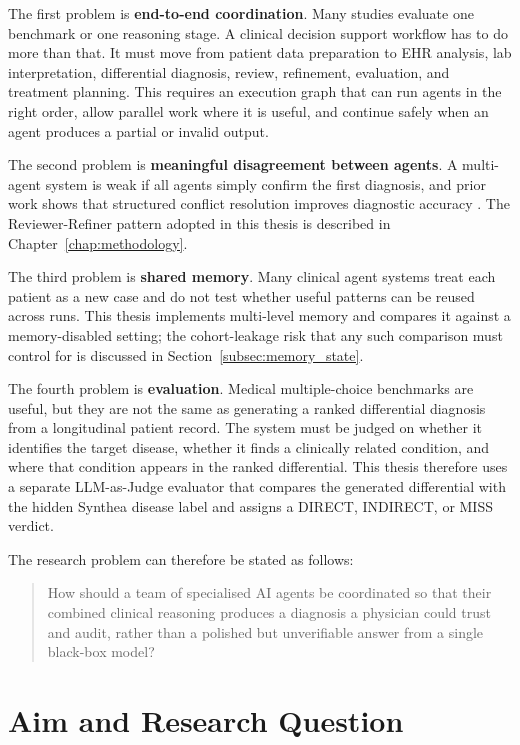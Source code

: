 The first problem is \textbf{end-to-end coordination}. Many studies evaluate
one benchmark or one reasoning stage. A clinical decision support workflow has
to do more than that. It must move from patient data preparation to EHR
analysis, lab interpretation, differential diagnosis, review, refinement,
evaluation, and treatment planning. This requires an execution graph that can
run agents in the right order, allow parallel work where it is useful, and
continue safely when an agent produces a partial or invalid output.

The second problem is \textbf{meaningful disagreement between agents}.
A multi-agent system is weak if all agents simply confirm the first
diagnosis, and prior work shows that structured conflict resolution
improves diagnostic accuracy \cite{Fan2024AIHospital,Wang2025Catfish}.
The Reviewer-Refiner pattern adopted in this thesis is described in
Chapter~\ref{chap:methodology}.

The third problem is \textbf{shared memory}. Many clinical agent
systems treat each patient as a new case and do not test whether
useful patterns can be reused across runs. This thesis implements
multi-level memory and compares it against a memory-disabled setting;
the cohort-leakage risk that any such comparison must control for is
discussed in Section~\ref{subsec:memory_state}.

The fourth problem is \textbf{evaluation}. Medical multiple-choice benchmarks
are useful, but they are not the same as generating a ranked differential
diagnosis from a longitudinal patient record. The system must be judged on
whether it identifies the target disease, whether it finds a clinically related
condition, and where that condition appears in the ranked differential. This
thesis therefore uses a separate LLM-as-Judge evaluator that compares the
generated differential with the hidden Synthea disease label and assigns a
DIRECT, INDIRECT, or MISS verdict.

The research problem can therefore be stated as follows:

\begin{quote}
How should a team of specialised AI agents be coordinated so that their
combined clinical reasoning produces a diagnosis a physician could trust
and audit, rather than a polished but unverifiable answer from a single
black-box model?
\end{quote}

\section{Aim and Research Question}
\label{sec:aim}

